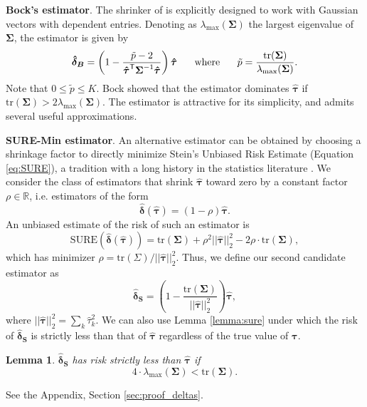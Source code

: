 \documentclass{article}
\newcommand{\bsSigma}{\boldsymbol \Sigma}
\newcommand{\bstau}{\boldsymbol \tau}
\newcommand{\hbstau}{\boldsymbol{\hat \tau}}
\newcommand{\bsSig}{\boldsymbol  \Sigma}
\newtheorem{lemma}{Lemma}
\newenvironment{proof*}
  {\renewcommand{\qedsymbol}{}\proof}
  {\endproof}
\newcommand{\Tr}{\text{tr}}
\newcommand{\bsdelt}{\boldsymbol{\hat \delta}}
\newcommand{\bsdeltb}{\boldsymbol {\hat \delta_B}}
\newcommand{\bsdelts}{\boldsymbol {\hat \delta_S}}
\newcommand{\tran}{\mathsf{T}}
\newcommand{\lambdamax}{\lambda_{\text{max}}(\bsSig)}
\begin{document}
\textbf{Bock's estimator}. The shrinker of \cite{bock1975minimax} is explicitly designed to work with Gaussian vectors with dependent entries. 
Denoting as $\lambdamax$ the largest eigenvalue of $\bsSig$, the estimator is given by 
\[ \bsdeltb = \left(1 - \frac{\tilde p - 2}{\hbstau^\tran \bsSig^{-1} \hbstau} \right) \hbstau \hspace{5mm} \text{ where } \hspace{5mm} \tilde p = \frac{\Tr(\bsSig)}{\lambdamax}. \]
Note that $0 \leq \tilde p \leq K$. Bock showed that the estimator dominates $\hbstau$ if $\Tr(\bsSig) > 2\lambdamax$. The estimator is attractive for its simplicity, and admits several useful approximations. 

\textbf{SURE-Min estimator}. An alternative estimator can be obtained by 
choosing a shrinkage factor to directly minimize Stein's Unbiased Risk Estimate (Equation \ref{eq:SURE}), a tradition with a long history in the statistics literature \citep[see e.g.][]{li1985stein, xie2012sure}. We consider the class of  estimators that shrink $\hbstau$ toward zero by a constant factor $\rho \in \mathbb{R}$, i.e. estimators of the form
\[ \bsdelt(\hbstau) = (1 - \rho)\hbstau.\]
An unbiased estimate of the risk of such an estimator is 
\[ \text{SURE}(\bsdelt(\hbstau)) = \Tr(\bsSigma ) + \rho^2 || \hbstau ||_2^2 - 2\rho \cdot \Tr(\bsSig), \]
which has minimizer $\rho = \Tr(\Sigma) \big/ ||\hbstau||_2^2$. Thus, we define our second candidate estimator as 
\[ \bsdelts = \left( 1 - \frac{\Tr(\bsSig)}{||\hbstau||_2^2}\right) \hbstau, \]
where $|| \hbstau ||_2^2 = \sum_k \hat \tau_k^2$. We can also use Lemma \ref{lemma:sure} under which the risk of $\bsdelts$ is strictly less than that of $\hbstau$ regardless of the true value of $\bstau$. 


\begin{lemma}\label{lemma:riskBound_deltas}
$\bsdelts$ has risk strictly less than $\hbstau$ if 
\[ 4 \cdot \lambdamax <  \Tr(\bsSig).\]
\end{lemma}

\begin{proof*}
See the Appendix, Section \ref{sec:proof_deltas}.  
\end{proof*}
 
\end{document}
